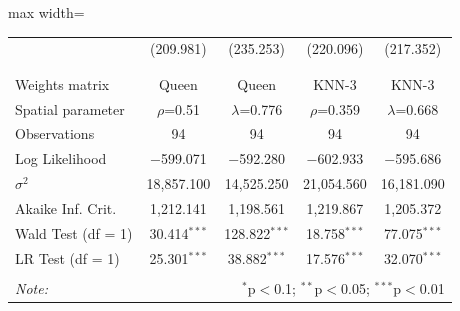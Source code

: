 \begin{table}[!htbp]
\begin{adjustbox}{max width=\linewidth}
\begin{tabular}{@{\extracolsep{5pt}}lcccc}
  & (209.981) & (235.253) & (220.096) & (217.352) \\ 
  & & & & \\ 
\hline \\[-1.8ex] 
Weights matrix & Queen & Queen & KNN-3 & KNN-3 \\ 
Spatial parameter & $\rho$=0.51 & $\lambda$=0.776 & $\rho$=0.359 & $\lambda$=0.668 \\ 
Observations & 94 & 94 & 94 & 94 \\ 
Log Likelihood & $-$599.071 & $-$592.280 & $-$602.933 & $-$595.686 \\ 
$\sigma^{2}$ & 18,857.100 & 14,525.250 & 21,054.560 & 16,181.090 \\ 
Akaike Inf. Crit. & 1,212.141 & 1,198.561 & 1,219.867 & 1,205.372 \\ 
Wald Test (df = 1) & 30.414$^{***}$ & 128.822$^{***}$ & 18.758$^{***}$ & 77.075$^{***}$ \\ 
LR Test (df = 1) & 25.301$^{***}$ & 38.882$^{***}$ & 17.576$^{***}$ & 32.070$^{***}$ \\ 
\hline 
\hline \\[-1.8ex] 
\textit{Note:}  & \multicolumn{4}{r}{$^{*}$p$<$0.1; $^{**}$p$<$0.05; $^{***}$p$<$0.01} \\ 
\end{tabular} 
\end{adjustbox}
\end{table} 
